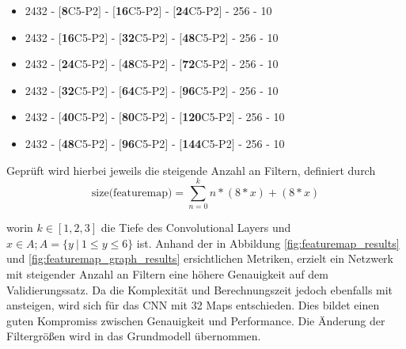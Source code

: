 \begin{itemize}
	\item 2432 - $[$\textbf{8}C5-P2$]$ - $[$\textbf{16}C5-P2$]$ - $[$\textbf{24}C5-P2$]$ - 256 - 10
	\item 2432 - $[$\textbf{16}C5-P2$]$ - $[$\textbf{32}C5-P2$]$ - $[$\textbf{48}C5-P2$]$ - 256 - 10
	\item 2432 - $[$\textbf{24}C5-P2$]$ - $[$\textbf{48}C5-P2$]$ - $[$\textbf{72}C5-P2$]$ - 256 - 10
	\item 2432 - $[$\textbf{32}C5-P2$]$ - $[$\textbf{64}C5-P2$]$ - $[$\textbf{96}C5-P2$]$ - 256 - 10
	\item 2432 - $[$\textbf{40}C5-P2$]$ - $[$\textbf{80}C5-P2$]$ - $[$\textbf{120}C5-P2$]$ - 256 - 10
	\item 2432 - $[$\textbf{48}C5-P2$]$ - $[$\textbf{96}C5-P2$]$ - $[$\textbf{144}C5-P2$]$ - 256 - 10
\end{itemize}

Geprüft wird hierbei jeweils die steigende Anzahl an Filtern, definiert durch
\begin{equation}
	\text{size(featuremap)} = \sum_{n=0}^k n * (8 * x) + (8 * x)
\end{equation}

worin $k \in [1, 2, 3]$ die Tiefe des Convolutional Layers und $x \in A; A = \{y~|~1 \leqslant y \leqslant 6\}$ ist. Anhand der in Abbildung \ref{fig:featuremap_results} und \ref{fig:featuremap_graph_results} ersichtlichen Metriken, erzielt ein Netzwerk mit steigender Anzahl an Filtern eine höhere Genauigkeit auf dem Validierungssatz. Da die Komplexität und Berechnungszeit jedoch ebenfalls mit ansteigen, wird sich für das CNN mit 32 Maps entschieden. Dies bildet einen guten Kompromiss zwischen Genauigkeit und Performance. Die Änderung der Filtergrößen wird in das Grundmodell übernommen. 

